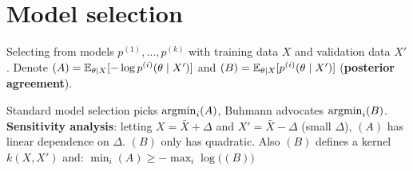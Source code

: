 \section{Model selection}
Selecting from models $p^{(1)}, \ldots, p^{(k)}$
with training data $X$ and validation data $X'$.
Denote
$(A) = \mathbb E_{\theta \mid X} [
    -\log p^{(i)} (\theta \mid X')
]$
and
$(B) = \mathbb E_{\theta \mid X} [p^{(i)}(\theta \mid X')]$
(\textbf{posterior agreement}).

Standard model selection picks $\mathop{\mathrm{argmin}}_{i} (A)$,
Buhmann advocates $\mathop{\mathrm{argmin}}_{i} (B)$.
\textbf{Sensitivity analysis}: letting $X = \bar{X} + \Delta$
and $X' = \bar{X} - \Delta$ (small $\Delta$),
$(A)$ has linear dependence on $\Delta$.
$(B)$ only has quadratic.
Also $(B)$ defines a kernel $k(X, X')$ and: $\min_i (A) \geq -\max_i \log \big( (B) \big)$